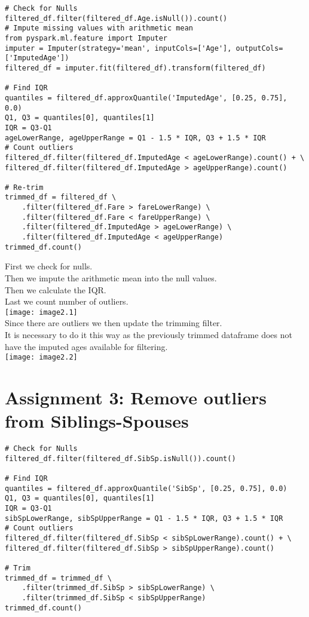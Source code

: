 \documentclass[]{article}
\begin{document}
\begin{verbatim}
# Check for Nulls
filtered_df.filter(filtered_df.Age.isNull()).count()
# Impute missing values with arithmetic mean
from pyspark.ml.feature import Imputer
imputer = Imputer(strategy='mean', inputCols=['Age'], outputCols=['ImputedAge'])
filtered_df = imputer.fit(filtered_df).transform(filtered_df)

# Find IQR 
quantiles = filtered_df.approxQuantile('ImputedAge', [0.25, 0.75], 0.0)
Q1, Q3 = quantiles[0], quantiles[1]
IQR = Q3-Q1
ageLowerRange, ageUpperRange = Q1 - 1.5 * IQR, Q3 + 1.5 * IQR
# Count outliers
filtered_df.filter(filtered_df.ImputedAge < ageLowerRange).count() + \
filtered_df.filter(filtered_df.ImputedAge > ageUpperRange).count()

# Re-trim
trimmed_df = filtered_df \
	.filter(filtered_df.Fare > fareLowerRange) \
	.filter(filtered_df.Fare < fareUpperRange) \
	.filter(filtered_df.ImputedAge > ageLowerRange) \
	.filter(filtered_df.ImputedAge < ageUpperRange)
trimmed_df.count()
\end{verbatim}
First we check for nulls. \\
Then we impute the arithmetic mean into the null values. \\
Then we calculate the IQR. \\
Last we count number of outliers. \vspace{1em} \\
\texttt{[image: image2.1]} \\

Since there are outliers we then update the trimming filter. \\
It is necessary to do it this way as the previously trimmed dataframe does not have the imputed ages available for filtering. \vspace{1em} \\
\texttt{[image: image2.2]}

\clearpage

\section*{Assignment 3: Remove outliers from Siblings-Spouses}

\begin{verbatim}
# Check for Nulls
filtered_df.filter(filtered_df.SibSp.isNull()).count()

# Find IQR 
quantiles = filtered_df.approxQuantile('SibSp', [0.25, 0.75], 0.0)
Q1, Q3 = quantiles[0], quantiles[1]
IQR = Q3-Q1
sibSpLowerRange, sibSpUpperRange = Q1 - 1.5 * IQR, Q3 + 1.5 * IQR
# Count outliers
filtered_df.filter(filtered_df.SibSp < sibSpLowerRange).count() + \
filtered_df.filter(filtered_df.SibSp > sibSpUpperRange).count()

# Trim
trimmed_df = trimmed_df \
	.filter(trimmed_df.SibSp > sibSpLowerRange) \
	.filter(trimmed_df.SibSp < sibSpUpperRange)
trimmed_df.count()
\end{verbatim}
\end{document}
